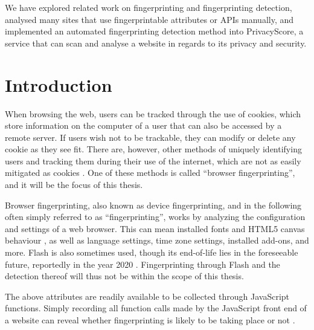 \documentclass[
    fontsize=12pt,
    headings=small,
    parskip=half,
    bibliography=totoc,
    numbers=noenddot,
    open=any
    ]{scrreprt}
\begin{document}
We have explored related work on fingerprinting and fingerprinting detection,
analysed many sites that use fingerprintable attributes or APIs manually,
and implemented an automated fingerprinting detection method into PrivacyScore,
a service that can scan and analyse a website in regards to its privacy and security.

\newpage
\null\newpage

\setcounter{tocdepth}{1}
\tableofcontents

\newpage
\null\newpage

\chapter{Introduction}
\label{chap:introduction}

When browsing the web, users can be tracked through the use of cookies, which store information on the computer of a user
that can also be accessed by a remote server.
If users wish not to be trackable, they can modify or delete any cookie as they see fit.
There are, however, other methods of uniquely identifying users and tracking them during their use of the internet,
which are not as easily mitigated as cookies \cite{am_i_unique}. One of these methods is called ``browser fingerprinting'',
and it will be the focus of this thesis.

Browser fingerprinting, also known as device fingerprinting, and in the following often simply referred to as ``fingerprinting'',
works by analyzing the configuration and settings of a web browser. This can mean installed fonts and HTML5 canvas behaviour
\cite{DBLP:conf/ccs/EnglehardtN16}, as well as
language settings, time zone settings, installed add-ons, and more. Flash is also sometimes used, though
its end-of-life lies in the foreseeable future, reportedly in the year
2020 \cite{flash_eol}.
Fingerprinting through Flash and the detection thereof will thus not be within the scope of this thesis.

The above attributes are readily available to be collected through JavaScript functions. Simply recording
all function calls made by the JavaScript front end of a website can reveal whether fingerprinting is likely to
be taking place or not \cite{faiz2014browser, panopticlick}.
\end{document}
